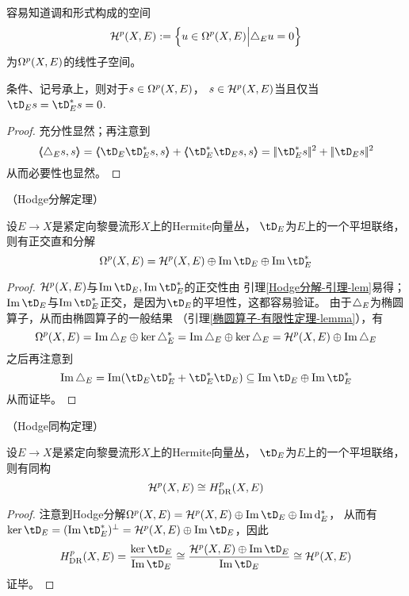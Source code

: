 容易知道调和形式构成的空间
$$
  \mathcal{H}^p(X,E):=\Big\{ u\in\Omega^p(X,E) \Big| \triangle_{E}u=0 \Big\}
$$
为$\Omega^p(X,E)$的线性子空间。

\begin{lemma}\label{Hodge分解-引理-lem}
条件、记号承上，则对于$s\in\Omega^p(X,E)$，
$s\in\mathcal{H}^p(X,E)$当且仅当$\tD_E s=\tD_{E}^*s=0$.
\end{lemma}

\begin{proof}
充分性显然；再注意到
$$
  \ppair{\yc_E s}{s}
=
  \ppair{\tD_E\tD_E^*s}{s}
+ \ppair{\tD_E^*\tD_Es}{s}
= \norm{\tD_E^*s}^2+\norm{\tD_Es}^2
$$
从而必要性也显然。
\end{proof}

\begin{thm}（Hodge分解定理）

设$E\to X$是紧定向黎曼流形$X$上的Hermite向量丛，
$\tD_E$为$E$上的一个平坦联络，则有正交直和分解
$$
  \Omg^p(X,E)
=
  \mcalH^p(X,E)\oplus\im\tD_E\oplus\im\tD^*_E
$$
\end{thm}

\begin{proof}
$\mathcal{H}^p(X,E)$与$\im\tD_E,\im\tD_E^*$的正交性由
引理\ref{Hodge分解-引理-lem}易得；
$\im\tD_E$与$\im\tD_E^*$正交，是因为$\tD_E$的平坦性，这都容易验证。
由于$\triangle_E$为椭圆算子，从而由椭圆算子的一般结果
（引理\ref{椭圆算子-有限性定理-lemma}），有
$$
  \Omega^p(X,E)=\operatorname{Im}\triangle_E\oplus\ker\triangle_E^*
  =\operatorname{Im}\triangle_E\oplus\ker\triangle_E
  =\mathcal{H}^p(X,E)\oplus\operatorname{Im}\triangle_E
$$
之后再注意到
$$
  \im\yc_E
=
  \im(\tD_E\tD_E^*+\tD_E^*\tD_E)
\subseteq
  \im\tD_E\oplus\im\tD_E^*
$$
从而证毕。
\end{proof}

\begin{thm}（Hodge同构定理）

设$E\to X$是紧定向黎曼流形$X$上的Hermite向量丛，
$\tD_E$为$E$上的一个平坦联络，则有同构
$$\mathcal{H}^p(X,E)\cong H^p_{\operatorname{DR}}(X,E)$$
\end{thm}

\begin{proof}
注意到Hodge分解$\Omg^p(X,E)=\mcalH^p(X,E)\oplus\im\tD_E\oplus\im\td_E^*$，
从而有$\ker\tD_E=(\im\tD_E^*)^{\bot}=\mcalH^p(X,E)\oplus\im\tD_E$，因此
$$
  H^p_{\DR}(X,E)
=
  \frac{\ker\tD_E}{\im\tD_E}
\cong
  \frac{\mcalH^p(X,E)\oplus\im\tD_E}{\im\tD_E}
\cong
  \mcalH^p(X,E)
$$
证毕。
\end{proof}

